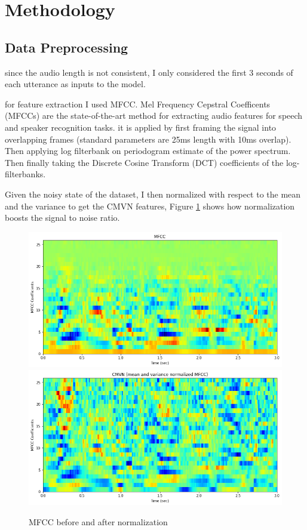 \documentclass{article}
\begin{document}
\section{Methodology}
\subsection{Data Preprocessing}
since the audio length is not consistent, I only considered the first 3 seconds of each utterance as inputs to the model. 

for feature extraction I used MFCC. Mel Frequency Cepstral Coefficents (MFCCs) are the state-of-the-art method for extracting audio features for speech and speaker recognition tasks. it is applied by first framing the signal into overlapping frames (standard parameters are 25ms length with 10ms overlap). Then applying log filterbank on periodogram estimate of the power spectrum. Then finally taking the Discrete Cosine Transform (DCT) coefficients of the log-filterbanks.\cite{jlyon}

Given the noisy state of the dataset, I then normalized with respect to the mean and the variance to get the CMVN features, Figure \ref{fig:normalizatin} shows how normalization boosts the signal to noise ratio.

\begin{figure}[H]
    \includegraphics[scale=.5]{images/mfcc.png}
    \includegraphics[scale=.5]{images/cmvn.png}
    \caption{MFCC before and after normalization}
    \label{fig:normalizatin}
\end{figure}
\end{document}
